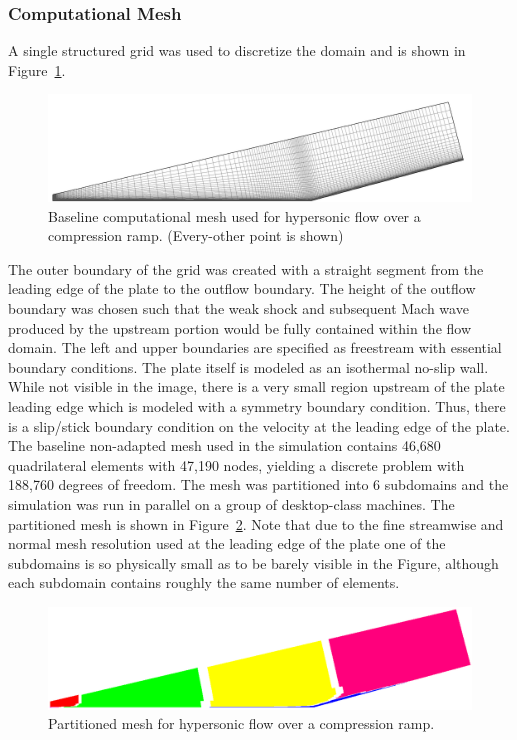 \subsubsection{Computational Mesh}
A single structured grid was used to discretize the domain and is shown in Figure~\ref{fig:ramp_mesh}.
\begin{figure}[hbtp]
  \begin{center}
    \includegraphics[width=\textwidth]{figures/holden_ramp/grid}
    \caption[Baseline computational mesh used for hypersonic flow over a compression ramp.]{Baseline computational mesh used for hypersonic flow over a compression ramp. (Every-other point is shown)\label{fig:ramp_mesh}}
  \end{center}
\end{figure}
The outer boundary of the grid was created with a straight segment from the leading edge of the plate to the outflow boundary.  The height of the outflow boundary was chosen such that the weak shock and subsequent Mach wave produced by the upstream portion would be fully contained within the flow domain. The left and upper boundaries are specified as freestream with essential boundary conditions.  The plate itself is modeled as an isothermal no-slip wall.  While not visible in the image, there is a very small region upstream of the plate leading edge which is modeled with a symmetry boundary condition.  Thus, there is a slip/stick boundary condition on the velocity at the leading edge of the plate.  The baseline non-adapted mesh used in the simulation contains 46,680 quadrilateral elements with 47,190 nodes, yielding a discrete problem with 188,760 degrees of freedom.  The mesh was partitioned into 6 subdomains and the simulation was run in parallel on a group of desktop-class machines. The partitioned mesh is shown in Figure~\ref{fig:ramp_partitioned}. Note that due to the fine streamwise and normal mesh resolution used at the leading edge of the plate one of the subdomains is so physically small as to be barely visible in the Figure, although each subdomain contains roughly the same number of elements.  
\begin{figure}[hbtp]
  \begin{center}
    \includegraphics[width=\textwidth]{figures/holden_ramp/partitioned}
    \caption{Partitioned mesh  for hypersonic flow over a compression ramp.\label{fig:ramp_partitioned}}
  \end{center}
\end{figure}



